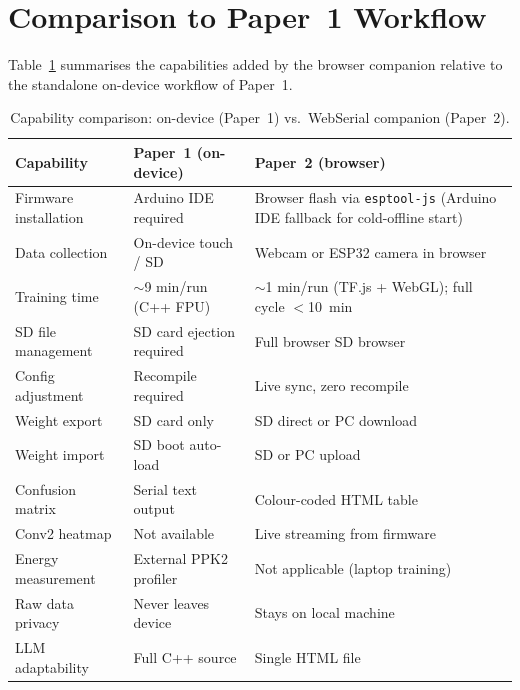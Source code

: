 \documentclass[11pt]{article}
\begin{document}
\section{Comparison to Paper~1 Workflow}

Table~\ref{tab:comparison} summarises the capabilities added by the browser companion
relative to the standalone on-device workflow of Paper~1.

\begin{table}[h]
\centering
\caption{Capability comparison: on-device (Paper~1) vs.\ WebSerial companion (Paper~2).}
\label{tab:comparison}
\begin{tabular}{@{}p{4.2cm}p{4cm}p{4.5cm}@{}}
\toprule
\textbf{Capability} & \textbf{Paper~1 (on-device)} & \textbf{Paper~2 (browser)} \\
\midrule
Firmware installation   & Arduino IDE required          & Browser flash via \texttt{esptool-js} (Arduino IDE fallback for cold-offline start) \\
Data collection         & On-device touch / SD          & Webcam or ESP32 camera in browser \\
Training time           & $\sim$9 min/run (C++ FPU)     & $\sim$1 min/run (TF.js + WebGL); full cycle $<$10~min \\
SD file management      & SD card ejection required     & Full browser SD browser \\
Config adjustment       & Recompile required            & Live sync, zero recompile \\
Weight export           & SD card only                  & SD direct or PC download \\
Weight import           & SD boot auto-load             & SD or PC upload \\
Confusion matrix        & Serial text output            & Colour-coded HTML table \\
Conv2 heatmap           & Not available                 & Live streaming from firmware \\
Energy measurement      & External PPK2 profiler        & Not applicable (laptop training) \\
Raw data privacy        & Never leaves device           & Stays on local machine \\
LLM adaptability        & Full C++ source               & Single HTML file \\
\bottomrule
\end{tabular}
\end{table}
\end{document}
